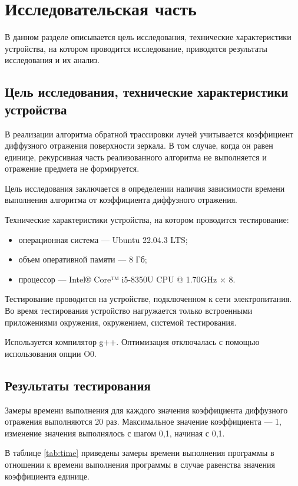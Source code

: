 \chapter{Исследовательская часть}

В данном разделе описывается цель исследования, технические характеристики устройства, на котором проводится исследование, приводятся результаты исследования и их анализ.

\section{Цель исследования, технические характеристики устройства}

В реализации алгоритма обратной трассировки лучей учитывается коэффициент диффузного отражения поверхности зеркала.
В том случае, когда он равен единице, рекурсивная часть реализованного алгоритма не выполняется и отражение предмета не формируется.

Цель исследования заключается в определении наличия зависимости времени выполнения алгоритма от коэффициента диффузного отражения.

Технические характеристики устройства, на котором проводится тестирование:
\begin{itemize}
	\item операционная система --- Ubuntu 22.04.3 LTS;
	\item объем оперативной памяти --- 8 Гб;
	\item процессор --- Intel® Core™ i5-8350U CPU @ 1.70GHz × 8.
\end{itemize}

Тестирование проводится на устройстве, подключенном к сети электропитания.
Во время тестирования устройство нагружается только встроенными приложениями окружения, окружением, системой тестирования.

Используется компилятор g++.
Оптимизация отключалась с помощью использования опции O0.

\section{Результаты тестирования}

Замеры времени выполнения для каждого значения коэффициента диффузного отражения выполняются 20 раз.
Максимальное значение коэффициента --- 1, изменение значения выполнялось с шагом 0,1, начиная с 0,1.

В таблице \ref{tab:time} приведены замеры времени выполнения программы в отношении к времени выполнения программы в случае равенства значения коэффициента единице.

